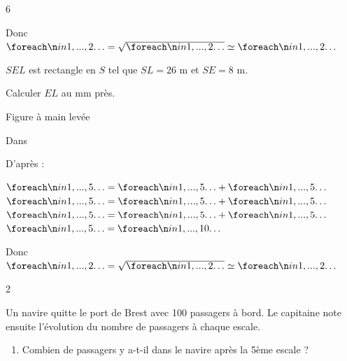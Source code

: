 \documentclass[a4paper]{book}
\begin{document}
{\begin{exerciceNote}{6}
\begin{minipage}{0.5\linewidth}
            \medskip
    
            Donc $\points[2]=\sqrt{\points[2]}\simeq\points[2]$
        \end{minipage}
        \vline
        \hfill
        \begin{minipage}{0.49\linewidth}
             $SEL$ est rectangle en $S$ tel que $SL = 26$ m et $SE = 8$ m. 
    
            Calculer $EL$ au mm près.
    
            \begin{center}
                \small{Figure à main levée}
                
            \end{center}
                
            Dans \points[18]
    
            \medskip
    
            D'après \points[15] :
    
            \medskip
    
            $\points[5] = \points[5]+\points[5]$ \\
            $\points[5] = \points[5]+\points[5]$ \\
            $\points[5] = \points[5]+\points[5]$ \\
            $\points[5] = \points[10]$ 
    
            \medskip
    
            Donc $\points[2]=\sqrt{\points[2]}\simeq\points[2]$
        \end{minipage}
    \end{exerciceNote}


    \begin{exerciceNote}{2}
        \begin{minipage}{0.7\linewidth}
            Un navire quitte le port de Brest avec 100 passagers à bord. Le capitaine note ensuite l'évolution du nombre de passagers à chaque escale.

            \begin{enumerate}
                \item Combien de passagers y a-t-il dans le navire après la 5ème escale ?

                \points[48]


\end{enumerate}
\end{minipage}
\end{exerciceNote}}
\end{document}
